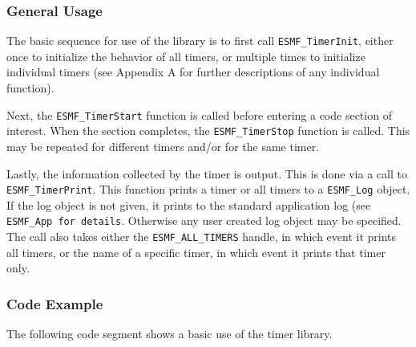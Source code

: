 \subsubsection{General Usage}
The basic sequence for use of the library is to first call {\tt ESMF\_TimerInit}, either
once to initialize the behavior of all timers, or multiple times to initialize individual
timers (see Appendix A for further descriptions of any individual function).

Next, the {\tt ESMF\_TimerStart} function is called before entering a code section of interest.  When
the section completes, the {\tt ESMF\_TimerStop} function is called.  This may be repeated 
for different timers and/or for the same timer.

Lastly, the information collected by the timer is output.  This is done via a call to 
{\tt ESMF\_TimerPrint}.  This function prints a timer or all timers to a {\tt ESMF\_Log} 
object.  If the log object is not given, it prints to the standard application log 
(see {\tt ESMF\_App for details}.  Otherwise any user created log object may be specified.
  The call also takes either the {\tt ESMF\_ALL\_TIMERS} handle, in which event it prints all
timers, or the name of a specific timer, in which event it prints that timer only.

\subsubsection{Code Example}
The following code segment shows a basic use of the timer library.


